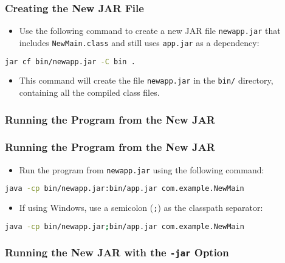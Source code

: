 \documentclass[aspectratio=169, table]{beamer}
\begin{document}
\begin{frame}[fragile]
	\frametitle{Creating the New JAR File}
	\begin{itemize}
		\item Use the following command to create a new JAR file \texttt{newapp.jar} that includes \texttt{NewMain.class} and still uses \texttt{app.jar} as a dependency:
	\end{itemize}
	\begin{lstlisting}[language=bash]
		jar cf bin/newapp.jar -C bin .
	\end{lstlisting}
	\begin{itemize}
		\item This command will create the file \texttt{newapp.jar} in the \texttt{bin/} directory, containing all the compiled class files.
	\end{itemize}
\end{frame}

\subsubsection{Running the Program from the New JAR}

\begin{frame}[fragile]
	\frametitle{Running the Program from the New JAR}
	\begin{itemize}
		\item Run the program from \texttt{newapp.jar} using the following command:
	\end{itemize}
	\begin{lstlisting}[language=bash]
		java -cp bin/newapp.jar:bin/app.jar com.example.NewMain
	\end{lstlisting}
	\begin{itemize}
		\item If using Windows, use a semicolon (\texttt{;}) as the classpath separator:
	\end{itemize}
	\begin{lstlisting}[language=bash]
		java -cp bin/newapp.jar;bin/app.jar com.example.NewMain
	\end{lstlisting}
\end{frame}

\subsubsection{Running the New JAR with the \texttt{-jar} Option}
\end{document}
